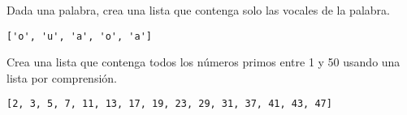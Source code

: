 \begin{exercise} Dada una palabra, crea una lista que contenga solo las vocales de la palabra.

\begin{Shaded}
\begin{Highlighting}[]
\OperatorTok{=} 
\OperatorTok{=}\NormalTok{ [letra } \NormalTok{]}
\end{Highlighting}
\end{Shaded}

\begin{verbatim}
['o', 'u', 'a', 'o', 'a']

\end{verbatim}
\end{exercise}

\begin{exercise} Crea una lista que contenga todos los números primos entre 1 y 50 usando una lista por comprensión.

\begin{Shaded}
\begin{Highlighting}[]
    \OperatorTok{\textgreater{}}   \OperatorTok{\%}\OperatorTok{!=}   \NormalTok{(}\NormalTok{, }\OperatorTok{**}\NormalTok{) }\OperatorTok{+} \NormalTok{))}

\OperatorTok{=}\NormalTok{ [x } \NormalTok{(}\NormalTok{, }\NormalTok{) }\NormalTok{ es\_primo(x)]}
\end{Highlighting}
\end{Shaded}

\begin{verbatim}
[2, 3, 5, 7, 11, 13, 17, 19, 23, 29, 31, 37, 41, 43, 47]

\end{verbatim}
\end{exercise}


